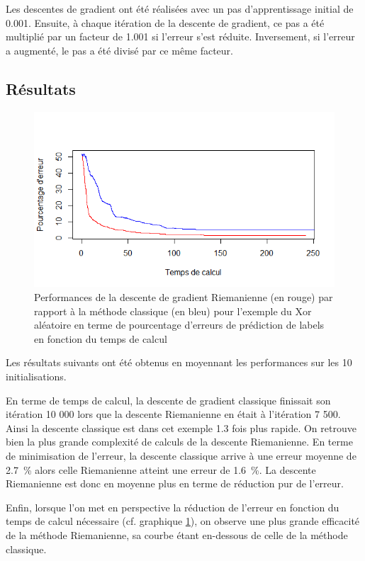 \documentclass{article}
\theoremstyle{definition}
\begin{document}
Les descentes de gradient ont été réalisées avec un pas d'apprentissage initial de 0.001. Ensuite, à chaque itération de la descente de gradient, ce pas a été multiplié par un facteur de 1.001 si l'erreur s'est réduite. Inversement, si l'erreur a augmenté, le pas a été divisé par ce même facteur.

\subsection{Résultats}

\begin{figure}[!ht]\centering
\includegraphics[scale=0.5]{XorPerf.png}
\caption{Performances de la descente de gradient Riemanienne (en rouge) par rapport à la méthode classique (en bleu) pour l'exemple du Xor aléatoire en terme de pourcentage d'erreurs de prédiction de labels en fonction du temps de calcul}
\label{fig:xorgrad}%
\end{figure}
Les résultats suivants ont été obtenus en moyennant les performances sur les 10 initialisations.

En terme de temps de calcul, la descente de gradient classique finissait son itération 10 000 lors que la descente Riemanienne en était à l'itération 7 500. Ainsi la descente classique est dans cet exemple 1.3 fois plus rapide. On retrouve bien la plus grande complexité de calculs de la descente Riemanienne.
En terme de minimisation de l'erreur, la descente classique arrive à une erreur moyenne de 2.7~\% alors celle Riemanienne atteint une erreur de 1.6~\%. La descente Riemanienne est donc en moyenne plus en terme de réduction pur de l'erreur.

Enfin, lorsque l'on met en perspective la réduction de l'erreur en fonction du temps de calcul nécessaire (cf. graphique \ref{fig:xorgrad}), on observe une plus grande efficacité de la méthode Riemanienne, sa courbe étant en-dessous de celle de la méthode classique.
\end{document}
